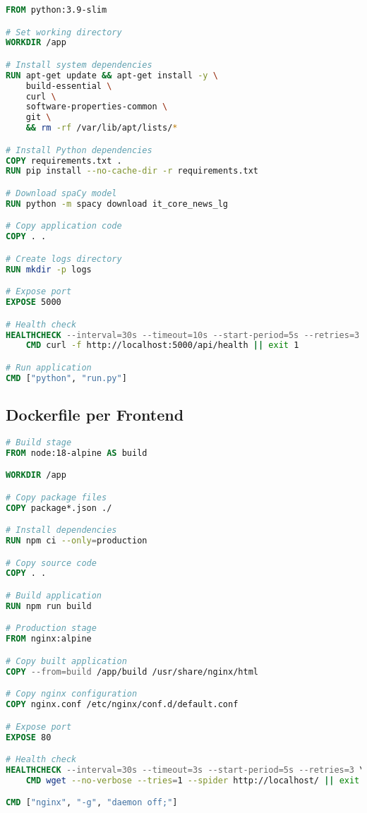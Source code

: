 \documentclass[12pt,a4paper]{report}
\begin{document}
\begin{lstlisting}[language=dockerfile, caption=backend/Dockerfile]
FROM python:3.9-slim

# Set working directory
WORKDIR /app

# Install system dependencies
RUN apt-get update && apt-get install -y \
    build-essential \
    curl \
    software-properties-common \
    git \
    && rm -rf /var/lib/apt/lists/*

# Install Python dependencies
COPY requirements.txt .
RUN pip install --no-cache-dir -r requirements.txt

# Download spaCy model
RUN python -m spacy download it_core_news_lg

# Copy application code
COPY . .

# Create logs directory
RUN mkdir -p logs

# Expose port
EXPOSE 5000

# Health check
HEALTHCHECK --interval=30s --timeout=10s --start-period=5s --retries=3 \
    CMD curl -f http://localhost:5000/api/health || exit 1

# Run application
CMD ["python", "run.py"]
\end{lstlisting}

\subsection{Dockerfile per Frontend}

\begin{lstlisting}[language=dockerfile, caption=frontend/Dockerfile]
# Build stage
FROM node:18-alpine AS build

WORKDIR /app

# Copy package files
COPY package*.json ./

# Install dependencies
RUN npm ci --only=production

# Copy source code
COPY . .

# Build application
RUN npm run build

# Production stage
FROM nginx:alpine

# Copy built application
COPY --from=build /app/build /usr/share/nginx/html

# Copy nginx configuration
COPY nginx.conf /etc/nginx/conf.d/default.conf

# Expose port
EXPOSE 80

# Health check
HEALTHCHECK --interval=30s --timeout=3s --start-period=5s --retries=3 \
    CMD wget --no-verbose --tries=1 --spider http://localhost/ || exit 1

CMD ["nginx", "-g", "daemon off;"]
\end{lstlisting}
\end{document}
